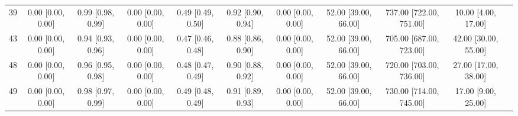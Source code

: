 \documentclass[8pt]{article}
\begin{document}
\begin{center}
\begin{footnotesize}
\begin{longtable}{|ccccccccccc|}
 39 &  0.00 [0.00, 0.00] &  0.99 [0.98, 0.99] &  0.00 [0.00, 0.00] &  0.49 [0.49, 0.50] &  0.92 [0.90, 0.94] &     0.00 [0.00, 0.00] &  52.00 [39.00, 66.00] &  737.00 [722.00, 751.00] &      10.00 [4.00, 17.00] \\
 43 &  0.00 [0.00, 0.00] &  0.94 [0.93, 0.96] &  0.00 [0.00, 0.00] &  0.47 [0.46, 0.48] &  0.88 [0.86, 0.90] &     0.00 [0.00, 0.00] &  52.00 [39.00, 66.00] &  705.00 [687.00, 723.00] &     42.00 [30.00, 55.00] \\
 48 &  0.00 [0.00, 0.00] &  0.96 [0.95, 0.98] &  0.00 [0.00, 0.00] &  0.48 [0.47, 0.49] &  0.90 [0.88, 0.92] &     0.00 [0.00, 0.00] &  52.00 [39.00, 66.00] &  720.00 [703.00, 736.00] &     27.00 [17.00, 38.00] \\
 49 &  0.00 [0.00, 0.00] &  0.98 [0.97, 0.99] &  0.00 [0.00, 0.00] &  0.49 [0.48, 0.49] &  0.91 [0.89, 0.93] &     0.00 [0.00, 0.00] &  52.00 [39.00, 66.00] &  730.00 [714.00, 745.00] &      17.00 [9.00, 25.00] \\
\end{longtable}
\end{footnotesize}
\end{center}
\end{document}
